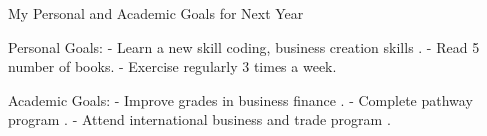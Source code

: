 My Personal and Academic Goals for Next Year

Personal Goals:
- Learn a new skill coding, business creation skills .
- Read 5 number of books.
- Exercise regularly  3 times a week.

Academic Goals:
- Improve grades in business finance .
- Complete pathway program .
- Attend international business and trade program .
